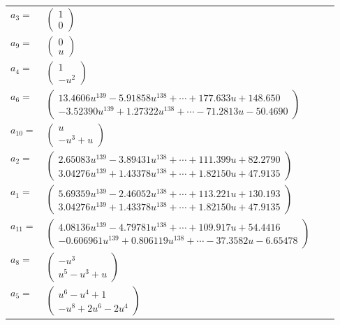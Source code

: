 \documentclass[1p]{elsarticle_modified}
\theoremstyle{definition}
\begin{document}
\begin{tabular}{m{7pt} m{180pt} m{7pt} m{180pt} }
\flushright $a_{3}=$&$\begin{pmatrix}1\\0\end{pmatrix}$ \\
\flushright $a_{9}=$&$\begin{pmatrix}0\\u\end{pmatrix}$ \\
\flushright $a_{4}=$&$\begin{pmatrix}1\\- u^2\end{pmatrix}$ \\
\flushright $a_{6}=$&$\begin{pmatrix}13.4606 u^{139}-5.91858 u^{138}+\cdots+177.633 u+148.650\\-3.52390 u^{139}+1.27322 u^{138}+\cdots-71.2813 u-50.4690\end{pmatrix}$ \\
\flushright $a_{10}=$&$\begin{pmatrix}u\\- u^3+u\end{pmatrix}$ \\
\flushright $a_{2}=$&$\begin{pmatrix}2.65083 u^{139}-3.89431 u^{138}+\cdots+111.399 u+82.2790\\3.04276 u^{139}+1.43378 u^{138}+\cdots+1.82150 u+47.9135\end{pmatrix}$ \\
\flushright $a_{1}=$&$\begin{pmatrix}5.69359 u^{139}-2.46052 u^{138}+\cdots+113.221 u+130.193\\3.04276 u^{139}+1.43378 u^{138}+\cdots+1.82150 u+47.9135\end{pmatrix}$ \\
\flushright $a_{11}=$&$\begin{pmatrix}4.08136 u^{139}-4.79781 u^{138}+\cdots+109.917 u+54.4416\\-0.606961 u^{139}+0.806119 u^{138}+\cdots-37.3582 u-6.65478\end{pmatrix}$ \\
\flushright $a_{8}=$&$\begin{pmatrix}- u^3\\u^5- u^3+u\end{pmatrix}$ \\
\flushright $a_{5}=$&$\begin{pmatrix}u^6- u^4+1\\- u^8+2 u^6-2 u^4\end{pmatrix}$ \\

\end{tabular}
\end{document}
